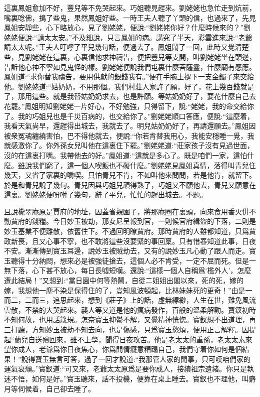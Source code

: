 \begin{parag}
    這裏鳳姐愈加不好，豐兒等不免哭起來。巧姐聽見趕來。劉姥姥也急忙走到炕前，嘴裏唸佛，搗了些鬼，果然鳳姐好些。一時王夫人聽了丫頭的信，也過來了，先見鳳姐安靜些，心下略放心，見了劉姥姥，便說:“劉姥姥你好？什麼時候來的？”劉姥姥便說:“請太太安。”不及細說，只言鳳姐的病。講究了半天，彩雲進來說:“老爺請太太呢。”王夫人叮嚀了平兒幾句話，便過去了。鳳姐鬧了一回，此時又覺清楚些，見劉姥姥在這裏，心裏信他求神禱告，便把豐兒等支開，叫劉姥姥坐在頭邊，告訴他心神不寧如見鬼怪的樣。劉姥姥便說我們屯裏什麼菩薩靈，什麼廟有感應。鳳姐道:“求你替我禱告，要用供獻的銀錢我有。”便在手腕上褪下一支金鐲子來交給他。劉姥姥道:“姑奶奶，不用那個。我們村莊人家許了願，好了，花上幾百錢就是了，那用這些。就是我替姑奶奶求去，也是許願。等姑奶奶好了，要花什麼自己去花罷。”鳳姐明知劉姥姥一片好心，不好勉強，只得留下，說:“姥姥，我的命交給你了。我的巧姐兒也是千災百病的，也交給你了。”劉姥姥順口答應，便說:“這麼着，我看天氣尚早，還趕得出城去，我就去了。明兒姑奶奶好了，再請還願去。”鳳姐因被衆冤魂纏繞害怕，巴不得他就去，便說:“你若肯替我用心，我能安穩睡一覺，我就感激你了。你外孫女兒叫他在這裏住下罷。”劉姥姥道:“莊家孩子沒有見過世面，沒的在這裏打嘴。我帶他去的好。”鳳姐道:“這就是多心了。既是咱們一家，這怕什麼。雖說我們窮了，這一個人喫飯也不礙什麼。”劉姥姥見鳳姐真情，落得叫青兒住幾天，又省了家裏的嚼喫。只怕青兒不肯，不如叫他來問問，若是他肯，就留下。於是和青兒說了幾句。青兒因與巧姐兒頑得熟了，巧姐又不願他去，青兒又願意在這裏。劉姥姥便吩咐了幾句，辭了平兒，忙忙的趕出城去。不題。
\end{parag}


\begin{parag}
    且說櫳翠庵原是賈府的地址，因蓋省親園子，將那庵圈在裏頭，向來食用香火併不動賈府的錢糧。今日妙玉被劫，那女尼呈報到官，一則候官府緝盜的下落，二則是妙玉基業不便離散，依舊住下。不過回明瞭賈府。那時賈府的人雖都知道，只爲賈政新喪，且又心事不寧，也不敢將這些沒要緊的事回稟。只有惜春知道此事，日夜不安。漸漸傳到寶玉耳邊，說妙玉被賊劫去，又有的說妙玉凡心動了跟人而走。寶玉聽得十分納悶，想來必是被強徒搶去，這個人必不肯受，一定不屈而死。但是一無下落，心下甚不放心，每日長噓短嘆。還說:“這樣一個人自稱爲‘檻外人’，怎麼遭此結局！”又想到:“當日園中何等熱鬧，自從二姐姐出閣以來，死的死，嫁的嫁，我想他一塵不染是保得住的了，豈知風波頓起，比林妹妹死的更奇！”由是一而二，二而三，追思起來，想到《莊子》上的話，虛無縹緲，人生在世，難免風流雲散，不禁的大哭起來。襲人等又道是他的瘋病發作，百般的溫柔解勸。寶釵初時不知何故，也用話箴規。怎奈寶玉抑鬱不解，又覺精神恍惚。寶釵想不出道理，再三打聽，方知妙玉被劫不知去向，也是傷感，只爲寶玉愁煩，便用正言解釋。因提起“蘭兒自送殯回來，雖不上學，聞得日夜攻苦。他是老太太的重孫，老太太素來望你成人，老爺爲你日夜焦心，你爲閒情癡意糟蹋自己，我們守着你如何是個結果！”說得寶玉無言可答，過了一回才說道:“我那管人家的閒事，只可嘆咱們家的運氣衰頹。”寶釵道:“可又來，老爺太太原爲是要你成人，接續祖宗遺緒。你只是執迷不悟，如何是好。”寶玉聽來，話不投機，便靠在桌上睡去。寶釵也不理他，叫麝月等伺候着，自己卻去睡了。
\end{parag}



